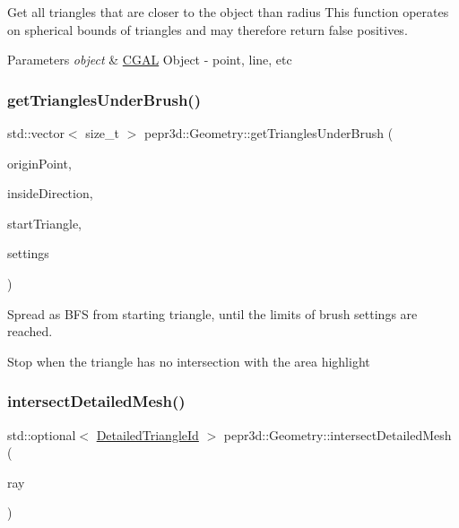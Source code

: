 Get all triangles that are closer to the object than radius This function operates on spherical bounds of triangles and may therefore return false positives. 


\begin{DoxyParams}{Parameters}
{\em object} & \mbox{\hyperlink{namespace_c_g_a_l}{C\+G\+AL}} Object -\/ point, line, etc \\
\hline
\end{DoxyParams}
\mbox{\label{classpepr3d_1_1_geometry_a1d420e96bc8c92c620b5473677173d81}} 
\subsubsection{\texorpdfstring{getTrianglesUnderBrush()}{getTrianglesUnderBrush()}}
{\footnotesize\ttfamily std\+::vector$<$ size\+\_\+t $>$ pepr3d\+::\+Geometry\+::get\+Triangles\+Under\+Brush (\begin{DoxyParamCaption}\item[{const glm\+::vec3 \&}]{origin\+Point,  }\item[{const glm\+::vec3 \&}]{inside\+Direction,  }\item[{size\+\_\+t}]{start\+Triangle,  }\item[{const struct \mbox{\hyperlink{structpepr3d_1_1_brush_settings}{Brush\+Settings}} \&}]{settings }\end{DoxyParamCaption})}



Spread as B\+FS from starting triangle, until the limits of brush settings are reached. 

Stop when the triangle has no intersection with the area highlight \mbox{\label{classpepr3d_1_1_geometry_ae68a633ab4ab435156e0b03e64c9ede9}} 
\subsubsection{\texorpdfstring{intersectDetailedMesh()}{intersectDetailedMesh()}}
{\footnotesize\ttfamily std\+::optional$<$ \mbox{\hyperlink{structpepr3d_1_1_detailed_triangle_id}{Detailed\+Triangle\+Id}} $>$ pepr3d\+::\+Geometry\+::intersect\+Detailed\+Mesh (\begin{DoxyParamCaption}\item[{const ci\+::\+Ray \&}]{ray }\end{DoxyParamCaption})}



